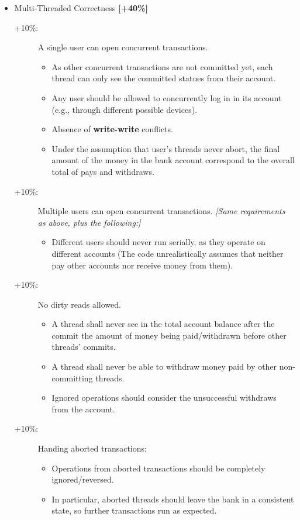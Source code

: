 \documentclass{article}
\begin{document}
\begin{itemize}
\begin{description}
		\end{description}


	\item  Multi-Threaded Correctness \textbf{[+40\%]}
\begin{description}
	\item [+10\%:] A single user can open concurrent transactions.
	\begin{itemize}
		\item As other concurrent transactions are not committed yet, each thread can only see the committed statues from their account.
		\item Any user should be allowed to concurrently log in in its account (e.g., through different possible devices).
		\item Absence of \textbf{write-write} conflicts.
		\item Under the assumption that user's threads never abort, the final amount of the money in the bank account correspond to the overall total of pays and withdraws.
	\end{itemize}
	\item [+10\%:] Multiple users can open concurrent transactions. \textit{[Same requirements as above, plus the following:]}
\begin{itemize}
	\item Different users should never run serially, as they operate on different accounts (The code unrealistically assumes that neither  pay other accounts nor receive money from them).
\end{itemize}
\item [+10\%:] No dirty reads allowed.
\begin{itemize}
	\item A thread shall never see in the total account balance after the commit the amount of money being paid/withdrawn before other threads' commits.
	\item A thread shall never be able to withdraw money paid by other non-committing threads. 
	\item Ignored operations should consider the unsuccessful withdraws from the account.
\end{itemize} 
\item [+10\%:] Handing aborted transactions:
\begin{itemize}
	\item Operations from aborted transactions should be completely ignored/reversed.
	\item In particular, aborted threads should leave the bank in a consistent state, so further transactions run as expected.
\end{itemize}
\end{description}



\end{itemize}
\end{document}
